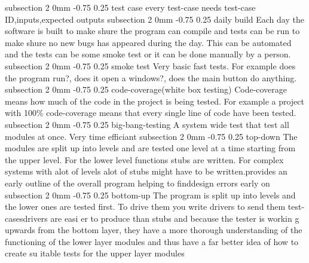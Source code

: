 \documentclass[a4paper,11pt]{article}
\makeatletter
\renewcommand{\subsection}{\@startsection
   {subsection}%
   {2}%
   {0mm}%
   {-0.75\baselineskip}%
   {0.25\baselineskip}%
   {\rmfamily\normalfont\slshape\normalsize}}%
\makeatother
\begin{document}
\subsection{test case}
every test-case needs test-case ID,inputs,expected outputs
\subsection{daily build}
Each day the software is built to make shure the program can compile and tests can be run to make shure no new bugs has appeared during the day. This can be automated and the tests can be some smoke test or it can be done manually by a person.
\subsection{smoke test}
Very basic fast tests. For example does the program run?, does it open a windows?, does the main button do anything. 
\subsection{code-coverage(white box testing)}
Code-coverage means how much of the code in the project is being tested. For example a project with 100\% code-coverage means that every single line of code have been tested. 
\subsection{big-bang-testing}
A system wide test that test all modules at once. Very time efficiant
\subsection{top-down}
The modules are split up into levels and are tested one level at a time starting from the upper level. For the lower level functions stubs are written. For complex systems with alot of levels alot of stubs might have to be written.provides an early outline of the overall program helping to finddesign errors early on
\subsection{bottom-up}
The program is split up into levels and the lower ones are tested first. To drive them you write drivers to send them test-casesdrivers are easi
er to
produce than stubs and because the tester is workin
g upwards
from the bottom layer, they have a more thorough
understanding of the functioning of the lower layer
modules
and thus have a far better idea of how to create su
itable tests
for the upper layer modules
\end{document}
